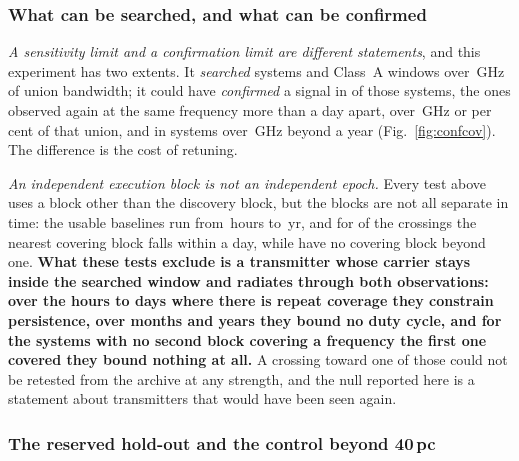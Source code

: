 \subsubsection{What can be searched, and what can be confirmed}
\label{sec:confirmability}

\emph{A sensitivity limit and a confirmation limit are different statements},
and this experiment has two extents. It \emph{searched} \RcSearchSys{} systems
and \RcSearchWin{} Class~A windows over \CvUnionA\,GHz of union bandwidth; it
could have \emph{confirmed} a signal in \RcConfSysDay{} of those systems, the
ones observed again at the same frequency more than a day apart, over
\CvConfGHzDay\,GHz or \CvConfPctDay{} per cent of that union, and in
\RcConfSysYr{} systems over \CvConfGHzYr\,GHz beyond a year
(Fig.~\ref{fig:confcov}). The difference is the cost of retuning.

\emph{An independent execution block is not an independent epoch.} Every test
above uses a block other than the discovery block, but the blocks are not all
separate in time: the usable baselines run from \RcSepMinH\,hours to
\RcSepMaxYr\,yr, and for \RcNSepSameDay{} of the \RcNExclPoss{} crossings the
nearest covering block falls within a day, while \CtNHourOnly{} have no
covering block beyond one. \textbf{What these tests exclude is a transmitter
whose carrier stays inside the searched window and radiates through both
observations: over the hours to days where there is repeat coverage they
constrain persistence, over months and years they bound no duty cycle, and for
the \RcNoRepSysAll{} systems with no second block covering a frequency the
first one covered they bound nothing at all.} A crossing toward one of those
could not be retested from the archive at any strength, and the null reported
here is a statement about transmitters that would have been seen again.

\subsubsection{The reserved hold-out and the control beyond 40\,pc}
\label{sec:holdoutsearch}

